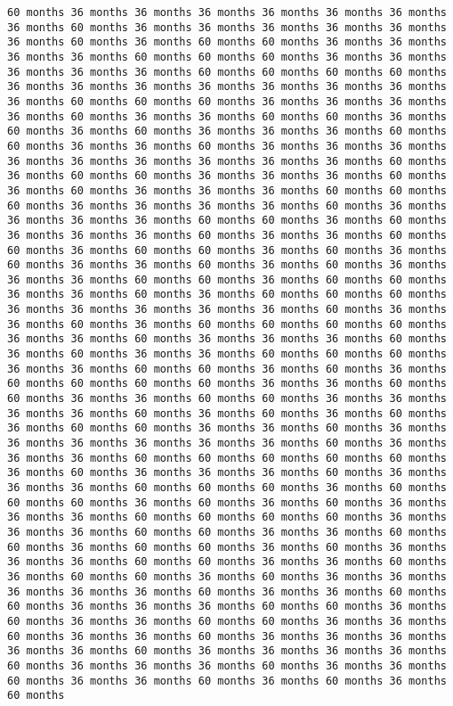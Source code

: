 \documentclass[11pt]{article}
\begin{document}
\begin{Verbatim}[commandchars=\\\{\}, frame=single, framerule=2mm, rulecolor=\color{outerrorbackground}]
60 months 36 months 36 months 36 months 36 months 36 months 36 months 36 months 60 months 36 months 36 months 36 months 36 months 36 months 36 months 60 months 36 months 60 months 60 months 36 months 36 months 36 months 36 months 60 months 60 months 60 months 36 months 36 months 36 months 36 months 36 months 60 months 60 months 60 months 60 months 36 months 36 months 36 months 36 months 36 months 36 months 36 months 36 months 60 months 60 months 60 months 36 months 36 months 36 months 36 months 60 months 36 months 36 months 60 months 60 months 36 months 60 months 36 months 60 months 36 months 36 months 36 months 60 months 60 months 36 months 36 months 60 months 36 months 36 months 36 months 36 months 36 months 36 months 36 months 36 months 36 months 60 months 36 months 60 months 60 months 36 months 36 months 36 months 60 months 36 months 60 months 36 months 36 months 36 months 60 months 60 months 60 months 36 months 36 months 36 months 36 months 60 months 36 months 36 months 36 months 36 months 60 months 60 months 36 months 60 months 36 months 36 months 36 months 60 months 36 months 36 months 60 months 60 months 36 months 60 months 60 months 36 months 60 months 36 months 60 months 36 months 36 months 60 months 36 months 60 months 36 months 36 months 36 months 60 months 60 months 36 months 60 months 60 months 36 months 36 months 60 months 36 months 60 months 60 months 60 months 36 months 36 months 36 months 36 months 36 months 60 months 36 months 36 months 60 months 36 months 60 months 60 months 60 months 60 months 36 months 36 months 60 months 36 months 36 months 36 months 60 months 36 months 60 months 36 months 36 months 60 months 60 months 60 months 36 months 36 months 60 months 60 months 36 months 60 months 36 months 60 months 60 months 60 months 60 months 36 months 36 months 60 months 60 months 36 months 36 months 60 months 60 months 36 months 36 months 36 months 36 months 60 months 36 months 60 months 36 months 60 months 36 months 60 months 60 months 36 months 36 months 60 months 36 months 36 months 36 months 36 months 36 months 36 months 60 months 36 months 36 months 36 months 60 months 60 months 60 months 60 months 60 months 36 months 60 months 36 months 36 months 36 months 60 months 36 months 36 months 36 months 60 months 60 months 60 months 36 months 60 months 60 months 60 months 36 months 60 months 36 months 60 months 36 months 36 months 36 months 60 months 60 months 60 months 60 months 36 months 36 months 36 months 60 months 60 months 36 months 36 months 60 months 60 months 36 months 60 months 60 months 36 months 60 months 36 months 36 months 36 months 60 months 60 months 36 months 36 months 60 months 36 months 60 months 60 months 36 months 60 months 36 months 36 months 36 months 36 months 36 months 60 months 36 months 36 months 60 months 60 months 36 months 36 months 36 months 60 months 60 months 36 months 60 months 36 months 36 months 60 months 60 months 36 months 36 months 60 months 36 months 36 months 60 months 36 months 36 months 36 months 36 months 36 months 60 months 36 months 36 months 36 months 36 months 60 months 36 months 36 months 36 months 60 months 36 months 36 months 60 months 36 months 36 months 60 months 36 months 60 months 36 months 60 months 
\end{Verbatim}
\end{document}
